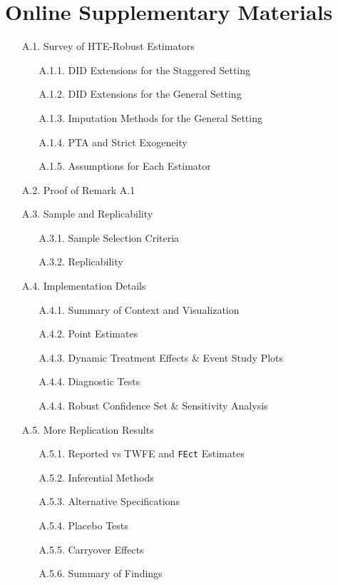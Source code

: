 \documentclass[12pt]{article}
\begin{document}
\vspace{0em}
\section{Online Supplementary Materials}
\bigskip


\noindent{}

{\footnotesize
\begin{enumerate}\itemsep0ex
    \item[A.1.] Survey of HTE-Robust Estimators
    \begin{itemize}
        \item[A.1.1.] DID Extensions for the Staggered Setting
        \item[A.1.2.] DID Extensions for the General Setting
        \item[A.1.3.] Imputation Methods for the General Setting
        \item[A.1.4.] PTA and Strict Exogeneity
        \item[A.1.5.] Assumptions for Each Estimator
    \end{itemize}
    \item[A.2.] Proof of Remark A.1
    \item[A.3.] Sample and Replicability
    \begin{itemize}
        \item[A.3.1.] Sample Selection Criteria
        \item[A.3.2.] Replicability
    \end{itemize}
    \item[A.4.] Implementation Details
    \begin{itemize}
        \item[A.4.1.] Summary of Context and Visualization
        \item[A.4.2.] Point Estimates
        \item[A.4.3.] Dynamic Treatment Effects \& Event Study Plots
        \item[A.4.4.] Diagnostic Tests
        \item[A.4.4.] Robust Confidence Set \& Sensitivity Analysis
    \end{itemize}
    \item[A.5.] More Replication Results
    \begin{itemize}
        \item[A.5.1.] Reported vs TWFE and \texttt{FEct} Estimates
        \item[A.5.2.] Inferential Methods
        \item[A.5.3.] Alternative Specifications
        \item[A.5.4.] Placebo Tests
        \item[A.5.5.] Carryover Effects
        \item[A.5.6.] Summary of Findings
    \end{itemize}
\end{enumerate}
}
\end{document}
